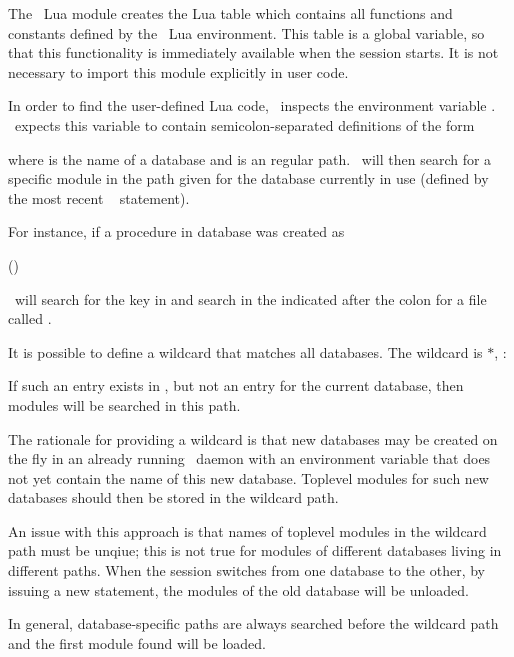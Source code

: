 \clearpage
The \nowdb\ Lua module creates the Lua table 
 which contains all
functions and constants defined by
the \nowdb\ Lua environment.
This table is a global variable,
so that this functionality is immediately available
when the session starts.
It is not necessary to import this module explicitly
in user code.

In order to find the user-defined Lua code,
\nowdb\ inspects the environment variable
. \nowdb\ expects
this variable to contain
semicolon-separated definitions of the form


where  is the name of a database and
 is an regular  path.
\nowdb\ will then search for a specific module
in the path given for the database currently
in use (defined by the most recent
\sql\  statement).

For instance, if a procedure in database 
was created as

 ()
 

\nowdb\ will search for the key  in
 and search in the 
indicated after the colon for a file called
.

It is possible to define a wildcard that matches all databases.
The wildcard is $\ast$, \eg:


If such an entry exists 
in ,
but not an entry for the current database,
then modules will be searched in this path.

The rationale for providing a wildcard is that
new databases may be created on the fly in an already
running \nowdb\ daemon with an environment variable
that does not yet contain the name of this new database.
Toplevel modules for such new databases
should then be stored in the wildcard path.

An issue with this approach is that names
of toplevel modules in the wildcard path must be unqiue;
this is not true for modules of different
databases living in different paths.
When the session switches from one database to the other,
by issuing a new  statement,
the modules of the old database will be unloaded.

In general, database-specific paths are always 
searched before the wildcard path
and the first module found will be
loaded.


